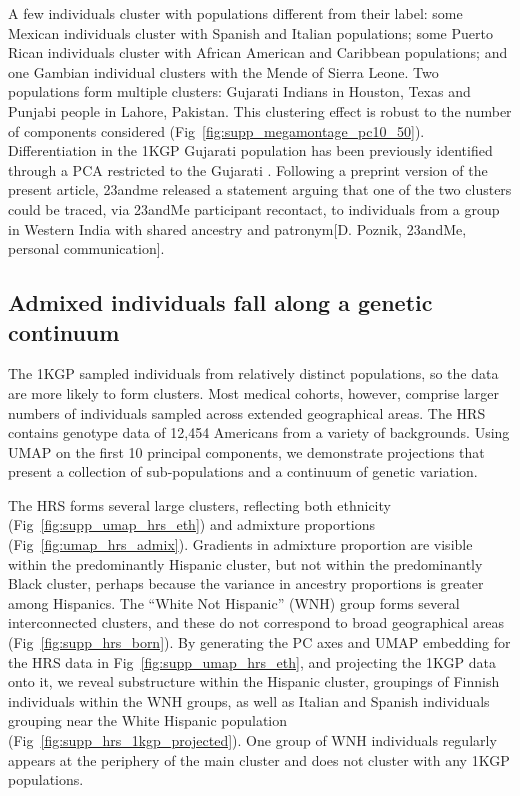 A few individuals cluster with populations different from their label: some Mexican individuals cluster with Spanish and Italian populations; some Puerto Rican individuals cluster with African American and Caribbean populations; and one Gambian individual clusters with the Mende of Sierra Leone. Two populations form multiple clusters: Gujarati Indians in Houston, Texas and Punjabi people in Lahore, Pakistan. This clustering effect is robust to the number of components considered (Fig~\ref{fig:supp_megamontage_pc10_50}). Differentiation in the 1KGP Gujarati population has been previously identified through a PCA restricted to the Gujarati \citep{reich2009india}. Following a preprint version of the present article, 23andme released a statement \citep{23andme} arguing that one of the two clusters could be traced, via 23andMe participant recontact, to individuals from a group in Western India with shared ancestry and patronym[D. Poznik, 23andMe, personal communication]\citep{23andme}.

\subsection{Admixed individuals fall along a genetic continuum}
The 1KGP sampled individuals from relatively distinct populations, so the data are more likely to form clusters. Most medical cohorts, however, comprise larger numbers of individuals sampled across extended geographical areas. The HRS contains genotype data of 12,454 Americans from a variety of backgrounds. Using UMAP on the first 10 principal components, we demonstrate projections that present a collection of sub-populations and a continuum of genetic variation.

The HRS forms several large clusters, reflecting both ethnicity (Fig~\ref{fig:supp_umap_hrs_eth}) and admixture proportions (Fig~\ref{fig:umap_hrs_admix}). Gradients in admixture proportion are visible within the predominantly Hispanic cluster, but not within the predominantly Black cluster, perhaps because the variance in ancestry proportions is greater among Hispanics. The ``White Not Hispanic'' (WNH) group forms several interconnected clusters, and these do not correspond to broad geographical areas (Fig~\ref{fig:supp_hrs_born}). By generating the PC axes and UMAP embedding for the HRS data in Fig~\ref{fig:supp_umap_hrs_eth}, and projecting the 1KGP data onto it, we reveal substructure within the Hispanic cluster, groupings of Finnish individuals within the WNH groups, as well as Italian and Spanish individuals grouping near the White Hispanic population (Fig~\ref{fig:supp_hrs_1kgp_projected}). One group of WNH individuals regularly appears at the periphery of the main cluster and does not cluster with any 1KGP populations.

